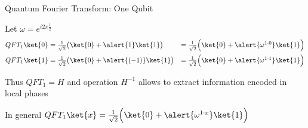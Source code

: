 \documentclass{beamer}
\begin{document}
\begin{frame}{Quantum Fourier Transform: One Qubit}

        Let $\omega = e^{i 2 \pi \frac{1}{2}}$
        \begin{align*}
                QFT_1 \ket{0} & = \textstyle{\frac{1}{\sqrt{2}} \big (\ket{0} 
                + \alert{1} \ket{1} \big )} & =
                        \textstyle{\frac{1}{\sqrt{2}} \Big (\ket{0} 
                        + \alert{\omega^{1 \cdot 0}} \ket{1} \Big )} &
                \\
                QFT_1 \ket{1} & = \textstyle{\frac{1}{\sqrt{2}} \big (\ket{0} 
                + \alert{(-1)} \ket{1} \big )}  & =
                \textstyle{\frac{1}{\sqrt{2}} \Big (\ket{0} 
                + \alert{\omega^{1 \cdot 1}} \ket{1} \Big )} &
        \end{align*}

        \pause
        Thus $QFT_1 = H$ and operation $H^{-1}$ allows to extract information
        encoded in local phases

        \pause
        In general $QFT_1 \ket{x} = \textstyle{\frac{1}{\sqrt{2}} \Big (\ket{0} 
        + \alert{\omega^{1 \cdot x}} \ket{1} \Big )}$
\end{frame}
\end{document}
